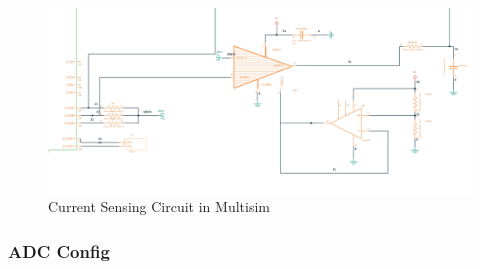 \begin{figure}[H]
	\centering
	\includegraphics[width=6in]{sections/section4/images/PCBDesign/Multisim/MultisimCurrentSensing.png}
	\caption{Current Sensing Circuit in Multisim}
\end{figure}


\subsubsection{ADC Config}


\newpage
